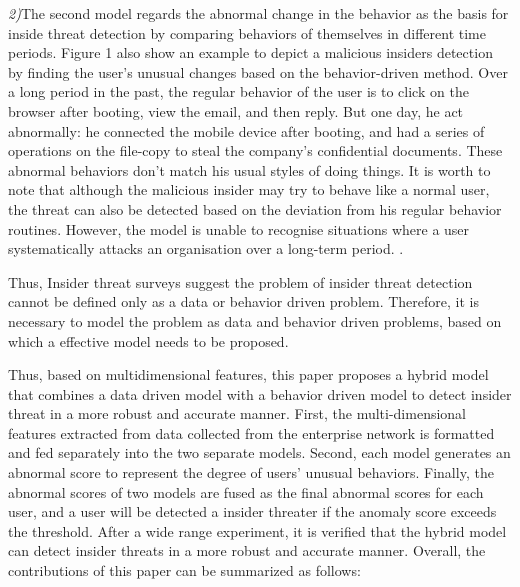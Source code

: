 \documentclass[conference]{IEEEtran}
\begin{document}
\noindent \emph{2)}The second model regards the abnormal change in the behavior as the basis for inside threat detection by comparing behaviors of themselves in different time periods.
Figure 1 also show an example to depict a malicious insiders detection by finding the user's unusual changes based on the behavior-driven method\cite{b8}. Over a long period in the past, the regular behavior of the user is to click on the browser after booting, view the email, and then reply. But one day, he act abnormally: he connected the mobile device after booting, and had a series of operations on the file-copy to steal the company's confidential documents. These abnormal behaviors don't match his usual styles of doing things. It is worth to note that although the malicious insider may try to behave like a normal user, the threat can also be detected based on the deviation from his regular behavior routines.
However, the model is unable to recognise situations where a user systematically attacks an
organisation over a long-term period. \cite{b2}. 

Thus, Insider threat surveys\cite{b9} suggest the problem of insider threat detection cannot be defined only as a data or behavior driven problem. Therefore, it is necessary to model the problem as data and behavior driven problems, based on which a effective model needs to be proposed.

Thus, based on multidimensional features, this paper proposes a hybrid model that combines a data driven model with a behavior driven model to detect insider threat in a more robust and accurate manner.
First, the multi-dimensional features extracted from data collected  from the enterprise network is formatted and fed separately into the two separate models. Second, each model generates an abnormal score to represent the degree of users' unusual behaviors. Finally, the abnormal scores of two models are fused as the final abnormal scores for each user, and a user will be detected a insider threater if the anomaly score exceeds the threshold. After a wide range experiment, it is 
verified that the hybrid model can detect insider threats in a more robust and accurate manner.
Overall, the contributions of this paper can be summarized as follows:
\end{document}
